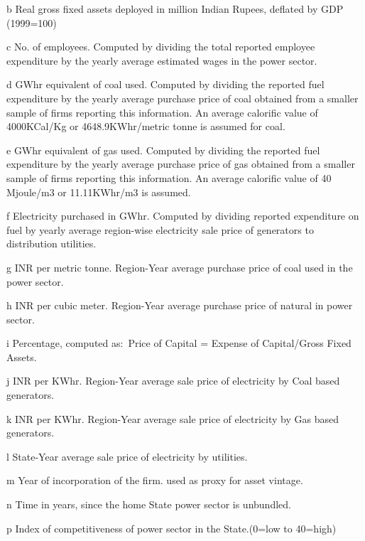 \begin{table}[htbp]
{\begin{threeparttable}
\begin{tablenotes}
       \item[b] Real gross fixed assets deployed in million Indian Rupees, deflated by GDP (1999=100)
       \item[c] No. of employees. Computed by dividing the total reported employee expenditure by the yearly average estimated wages in the power sector.
       \item[d] GWhr equivalent of coal used. Computed by dividing the reported fuel expenditure by the yearly average purchase price of coal obtained from a smaller sample of firms reporting this information. An average calorific value of 4000KCal/Kg or 4648.9KWhr/metric tonne is assumed for coal.
       \item[e] GWhr equivalent of gas used. Computed by dividing the reported fuel expenditure by the yearly average purchase price of gas obtained from a smaller sample of firms reporting this information. An average calorific value of 40 Mjoule/m3 or 11.11KWhr/m3 is assumed.
       \item[f] Electricity purchased in GWhr. Computed by dividing reported expenditure on fuel by yearly average region-wise electricity sale price of generators to distribution utilities.
       \item[g] INR per metric tonne. Region-Year average purchase price of coal used in the power sector.
       \item[h] INR per cubic meter. Region-Year average purchase price of natural in power sector.
       \item[i] Percentage, computed as$:$ Price of Capital = Expense of Capital/Gross Fixed Assets.
       \item[j] INR per KWhr. Region-Year average sale price of electricity by Coal based generators.
       \item[k] INR per KWhr. Region-Year average sale price of electricity by Gas based generators.
       \item[l] State-Year average sale price of electricity by utilities.
       \item[m] Year of incorporation of the firm. used as proxy for asset vintage.
       \item[n] Time in years, since the home State power sector is unbundled.
       \item[p] Index of competitiveness of power sector in the State.(0=low to 40=high)
 \end{tablenotes}
 \end{threeparttable}
 }
 \end{table}




